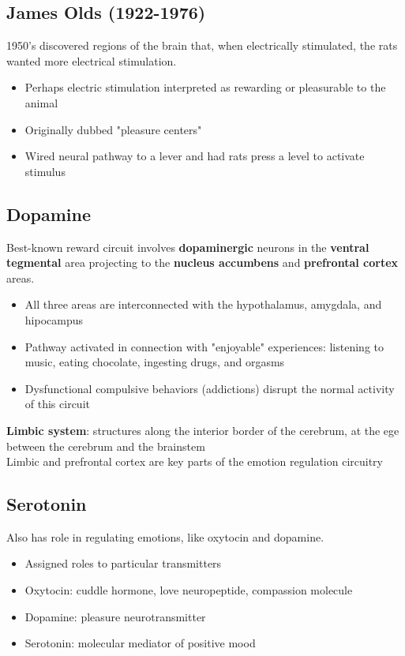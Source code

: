 \documentclass{article}
\begin{document}
\subsection{James Olds (1922-1976) }
1950's discovered regions of the brain that, when electrically stimulated, the rats wanted more electrical stimulation. 
\begin{itemize}
    \item Perhaps electric stimulation interpreted as rewarding or pleasurable to the animal
    \item Originally dubbed "pleasure centers" 
    \item Wired neural pathway to a lever and had rats press a level to activate stimulus
\end{itemize}

\subsection{Dopamine}
\noindent Best-known reward circuit involves \textbf{dopaminergic} neurons in the \textbf{ventral tegmental} area projecting to the \textbf{nucleus accumbens} and \textbf{prefrontal cortex} areas. 
\begin{itemize}
    \item All three areas are interconnected with the hypothalamus, amygdala, and hipocampus
    \item Pathway activated in connection with "enjoyable" experiences: listening to music, eating chocolate, ingesting drugs, and orgasms
    \item Dysfunctional compulsive behaviors (addictions) disrupt the normal activity of this circuit
\end{itemize}

\noindent\textbf{Limbic system}: structures along the interior border of the cerebrum, at the ege between the cerebrum and the brainstem \\

Limbic and prefrontal cortex are key parts of the emotion regulation circuitry 

\subsection{Serotonin}
Also has role in regulating emotions, like oxytocin and dopamine. 
\begin{itemize}
    \item Assigned roles to particular transmitters
    \item Oxytocin: cuddle hormone, love neuropeptide, compassion molecule
    \item Dopamine: pleasure neurotransmitter
    \item Serotonin: molecular mediator of positive mood
\end{itemize}
\end{document}
